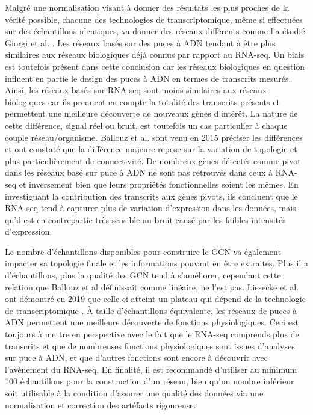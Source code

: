 Malgré une normalisation visant à donner des résultats les plus proches de la vérité possible, chacune des technologies de transcriptomique, même si effectuées sur des échantillons identiques, va donner des réseaux différents comme l'a étudié Giorgi et al. \cite{Giorgi2013Mar}. Les réseaux basés sur des puces à ADN tendant à être plus similaires aux réseaux biologiques déjà connus par rapport au RNA-seq. Un biais est toutefois présent dans cette conclusion car les réseaux biologiques en question influent en partie le design des puces à ADN en termes de transcrits mesurés. Ainsi, les réseaux basés sur RNA-seq sont moins similaires aux réseaux biologiques car ils prennent en compte la totalité des transcrits présents et permettent une meilleure découverte de nouveaux gènes d'intérêt. La nature de cette différence, signal réel ou bruit, est toutefois un cas particulier à chaque couple réseau/organisme. Ballouz et al. sont venu en 2015 \cite{Ballouz2015} préciser les différences et ont constaté que la différence majeure repose sur la variation de topologie et plus particulièrement de connectivité. De nombreux gènes détectés comme pivot dans les réseaux basé sur puce à ADN ne sont pas retrouvés dans ceux à RNA-seq et inversement bien que leurs propriétés fonctionnelles soient les mêmes. En investiguant la contribution des transcrits aux gènes pivots, ils concluent que le RNA-seq tend à capturer plus de variation d'expression dans les données, mais qu'il est en contrepartie très sensible au bruit causé par les faibles intensités d'expression. 

Le nombre d'échantillons disponibles pour construire le \acrshort{GCN} va également impacter sa topologie finale et les informations pouvant en être extraites. Plus il a d'échantillons, plus la qualité des \acrshort{GCN} tend à s'améliorer, cependant cette relation que Ballouz et al définissait comme linéaire, ne l'est pas. Liesecke et al. ont démontré en 2019 que celle-ci atteint un plateau qui dépend de la technologie de transcriptomique \cite{Liesecke2019}. À taille d'échantillons équivalente, les réseaux de puces à ADN permettent une meilleure découverte de fonctions physiologiques. Ceci est toujours à mettre en perspective avec le fait que le RNA-seq comprends plus de transcrits et que de nombreuses fonctions physiologiques sont issues d'analyses sur puce à ADN, et que d'autres fonctions sont encore à découvrir avec l'avènement du RNA-seq. En finalité, il est recommandé d'utiliser au minimum 100 échantillons pour la construction d'un réseau, bien qu'un nombre inférieur soit utilisable à la condition d'assurer une qualité des données via une normalisation et correction des artéfacts rigoureuse. 

